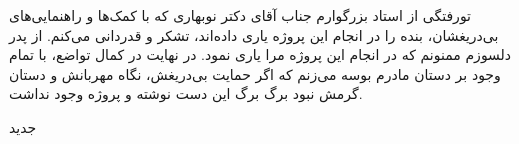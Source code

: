 


\begin{center}
\end{center}

‌تورفتگی از استاد بزرگوارم جناب آقای دکتر نوبهاری که با کمک‌ها و راهنمایی‌های بی‌دریغشان، بنده را در انجام این پروژه یاری داده‌اند، تشکر و قدردانی می‌کنم.
از پدر دلسوزم ممنونم که در انجام این پروژه مرا یاری نمود. در نهایت در کمال تواضع، با تمام وجود بر دستان مادرم بوسه می‌زنم که اگر حمایت بی‌دریغش، نگاه مهربانش و دستان گرمش نبود برگ برگ این دست نوشته و پروژه وجود نداشت.

‌جدید
